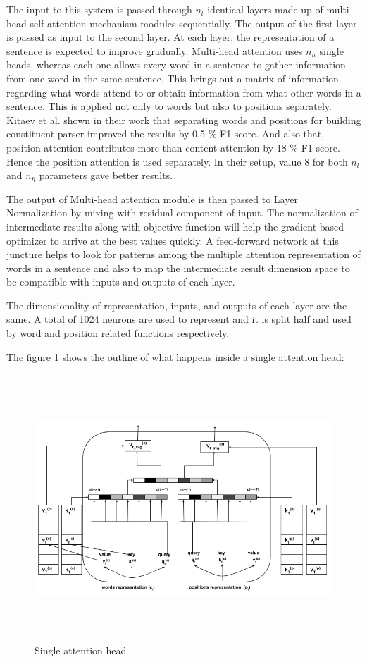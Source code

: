 \documentclass[a4paper, 11pt]{article}
\begin{document}
The input to this system is passed through $n_l$ identical layers made up of multi-head self-attention mechanism modules sequentially. The output of the first layer is passed as input to the second layer. At each layer, the representation of a sentence is expected to improve gradually. Multi-head attention uses $n_h$ single heads, whereas each one allows every word in a sentence to gather information from one word in the same sentence. This brings out a matrix of information regarding what words attend to or obtain information from what other words in a sentence. This is applied not only to words but also to positions separately. Kitaev et al. \parencite*{Kitaev2019} shown in their work that separating words and positions for building constituent parser improved the results by 0.5 \% F1 score. And also that, position attention contributes more than content attention by 18 \% F1 score. Hence the position attention is used separately. In their setup, value 8 for both $n_l$ and $n_h$ parameters gave better results. 

The output of Multi-head attention module is then passed to Layer Normalization by mixing with residual component of input. The normalization of intermediate results along with objective function will help the gradient-based optimizer to arrive at the best values quickly. A feed-forward network at this juncture helps to look for patterns among the multiple attention representation of words in a sentence and also to map the intermediate result dimension space to be compatible with inputs and outputs of each layer.  

The dimensionality of representation, inputs, and outputs of each layer are the same. A total of 1024 neurons are used to represent and it is split half and used by word and position related functions respectively. 


The figure \ref{fig:single_attention_head} shows the outline of what happens inside a single attention head:

\begin{figure}[htpb]
    \centering
    \includegraphics[width=\textwidth,height=10cm,keepaspectratio=true]
    {single-head-attention.png}
    \caption{
        Single attention head
    }
    \label{fig:single_attention_head}
\end{figure}
\end{document}
